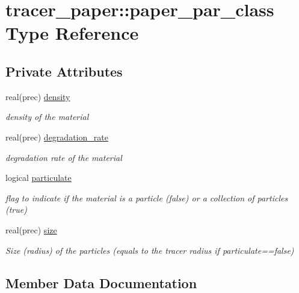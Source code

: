 \hypertarget{structtracer__paper_1_1paper__par__class}{}\section{tracer\+\_\+paper\+:\+:paper\+\_\+par\+\_\+class Type Reference}
\label{structtracer__paper_1_1paper__par__class}
\subsection*{Private Attributes}
\begin{DoxyCompactItemize}
\item 
real(prec) \hyperlink{structtracer__paper_1_1paper__par__class_a6d5b6834f7eae793f44202e07f4357df}{density}
\begin{DoxyCompactList}\small\item\em density of the material \end{DoxyCompactList}\item 
real(prec) \hyperlink{structtracer__paper_1_1paper__par__class_a123352996efb1f5edbc9bffdb1460554}{degradation\+\_\+rate}
\begin{DoxyCompactList}\small\item\em degradation rate of the material \end{DoxyCompactList}\item 
logical \hyperlink{structtracer__paper_1_1paper__par__class_aeab5446446cfc5d4cb33952a9fbb3c57}{particulate}
\begin{DoxyCompactList}\small\item\em flag to indicate if the material is a particle (false) or a collection of particles (true) \end{DoxyCompactList}\item 
real(prec) \hyperlink{structtracer__paper_1_1paper__par__class_a6e14c2ad93dba6e524d9eb1665af56e8}{size}
\begin{DoxyCompactList}\small\item\em Size (radius) of the particles (equals to the tracer radius if particulate==false) \end{DoxyCompactList}\end{DoxyCompactItemize}


\subsection{Member Data Documentation}
\mbox{\label{structtracer__paper_1_1paper__par__class_a123352996efb1f5edbc9bffdb1460554}} 
